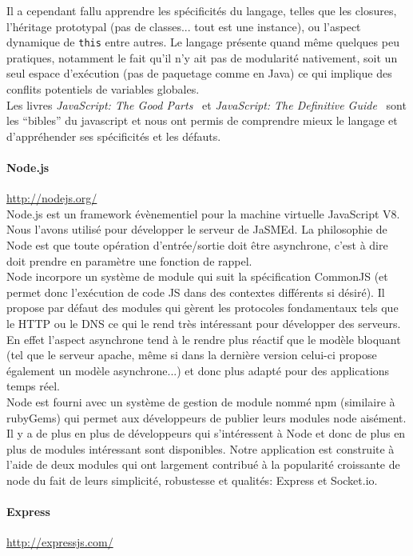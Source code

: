 \documentclass[pdftex,12pt,a4paper]{article}
\begin{document}
\medskip
Il a cependant fallu apprendre les spécificités du langage, telles que les closures, l’héritage prototypal (pas de classes... tout est une instance), ou l’aspect dynamique de \texttt{this} entre autres. Le langage présente quand même quelques peu pratiques, notamment le fait qu’il n’y ait pas de modularité nativement, soit un seul espace d’exécution (pas de paquetage comme en Java) ce qui implique des conflits potentiels de variables globales.\\
Les livres \emph{JavaScript: The Good Parts}~\cite{Crockford} et \emph{JavaScript: The Definitive Guide}~\cite{Flanagan} sont les “bibles” du javascript et nous ont permis de comprendre mieux le langage et d’appréhender ses spécificités et les défauts.

\paragraph{Node.js}\url{http://nodejs.org/}\\
Node.js est un framework évènementiel pour la machine virtuelle JavaScript V8. Nous l’avons utilisé pour développer le serveur de JaSMEd.
La philosophie de Node est que toute opération d’entrée/sortie doit être asynchrone, c’est à dire doit prendre en paramètre une fonction de rappel.\\
Node incorpore un système de module qui suit la spécification CommonJS (et permet donc l'exécution de code JS dans des contextes différents si désiré). Il propose par défaut des modules qui gèrent les protocoles fondamentaux tels que le HTTP ou le DNS ce qui le rend très intéressant pour développer des serveurs. En effet l’aspect asynchrone tend à le rendre plus réactif que le modèle bloquant (tel que le serveur apache, même si dans la dernière version celui-ci propose également un modèle asynchrone...) et donc plus adapté pour des applications temps réel.\\
Node est fourni avec un système de gestion de module nommé npm (similaire à rubyGems) qui permet aux développeurs de publier leurs modules node aisément.\\
Il y a de plus en plus de développeurs qui s’intéressent à Node et donc de plus en plus de modules intéressant sont disponibles. Notre application est construite à l’aide de deux modules qui ont largement contribué à la popularité croissante de node du fait de leurs simplicité, robustesse et qualités: Express et Socket.io.

\paragraph{Express}\url{http://expressjs.com/}
\end{document}
